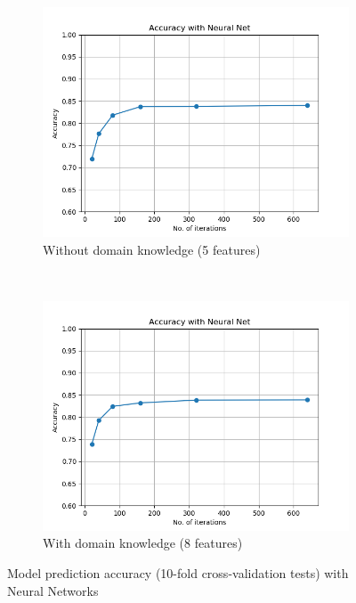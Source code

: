 \documentclass{article}
\begin{document}
\begin{figure}[h!]
    \centering
    \begin{subfigure}[b]{0.45\textwidth}
        \includegraphics[width=\textwidth]{../figures/wo_domain_knowledge/accuracy_neural_nets.png}
        \caption{Without domain knowledge (5  features)}
        \label{fig:gull}
    \end{subfigure}
    ~ %
    \begin{subfigure}[b]{0.45\textwidth}
        \includegraphics[width=\textwidth]{../figures/w_domain_knowledge/accuracy_neural_nets.png}
        \caption{With domain knowledge (8  features)}
        \label{fig:tiger}
    \end{subfigure}
    \caption{Model prediction accuracy (10-fold cross-validation tests) with Neural Networks}\label{fig:nn}
\end{figure}
\end{document}
